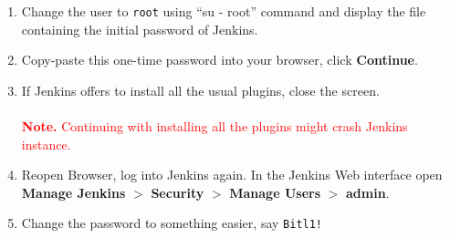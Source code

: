 \documentclass[11pt,a4paper]{article}
\begin{document}
\begin{enumerate}
\item Change the user to {\tt root} using ``su - root'' command and display 
the file containing the initial password of Jenkins.\\
\item Copy-paste this one-time password into your browser, click {\bf Continue}.
\item If Jenkins offers to install all the usual plugins, close the screen.\\ 
\\
\textcolor{red}{{\bf Note.} Continuing with installing all the plugins 
might crash Jenkins instance.} 
\item Reopen Browser, log into Jenkins again. 
In the Jenkins Web interface open {\bf Manage Jenkins} $>$ {\bf Security} $>$ 
{\bf Manage Users} $>$ {\bf admin}.\\
\item Change the password to something easier, say {\tt Bitl1!}\\

\end{enumerate}
\end{document}
